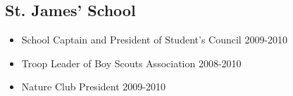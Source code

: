 \documentclass[11pt,a4paper]{moderncv}
\begin{document}
\subsection{St. James' School}
\begin{itemize}
\item School Captain and President of Student's Council \hfill 2009-2010
\item Troop Leader of Boy Scouts Association \hfill 2008-2010
\item Nature Club President \hfill 2009-2010
\begin{comment}
\item President of inter-school cultural fest Jaco Sanskriti\hfill 2009
\item Vice President of inter-school quiz competition Jaco-Iz\hfill 2009
\end{comment}
\end{itemize}
\begin{comment}
\subsection{Editor}
\item Jacobean \hfill 2009-10
\item Yearbook \hfill 2008-09
\item The School Scroll \hfill 2008-09
\subsection{Boy Scouts Movement}
\begin{itemize}
        \item Troop Leader of Scouting of the St. James' Boy Scouts Group
        \item Organized 3 winter camps with roughly 150 scouts and cubs from ages X-X
        \item Organized several hikes and outdoor excursions
        \item Extensive knowledge of the Scout Movement and Scout Techniques
\end{itemize}
\end{comment}
\end{document}
